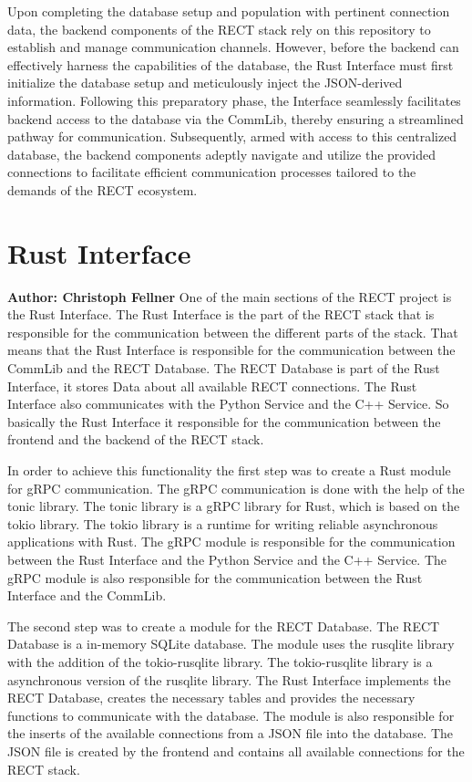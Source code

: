 Upon completing the database setup and population with pertinent connection data, the backend components of the RECT stack rely on this repository to establish and manage 
communication channels. However, before the backend can effectively harness the capabilities of the database, the Rust Interface must first initialize the database setup 
and meticulously inject the JSON-derived information. Following this preparatory phase, the Interface seamlessly facilitates backend access to the database via the CommLib,
thereby ensuring a streamlined pathway for communication. Subsequently, armed with access to this centralized database, the backend components adeptly navigate and utilize
the provided connections to facilitate efficient communication processes tailored to the demands of the RECT ecosystem.

\section{Rust Interface}
\textbf{Author: Christoph Fellner}
One of the main sections of the RECT project is the Rust Interface. The Rust Interface is the part of the RECT stack that is responsible for the communication between 
the different parts of the stack. That means that the Rust Interface is responsible for the communication between the CommLib and the RECT Database. The RECT Database is 
part of the Rust Interface, it stores Data about all available RECT connections. The Rust Interface also communicates with the Python Service and the C++ Service. So 
basically the Rust Interface it responsible for the communication between the frontend and the backend of the RECT stack.\newline

In order to achieve this functionality the first step was to create a Rust module for gRPC communication. The gRPC communication is done with the help of the tonic library.
The tonic library is a gRPC library for Rust, which is based on the tokio library. The tokio library is a runtime for writing reliable asynchronous applications with Rust.
The gRPC module is responsible for the communication between the Rust Interface and the Python Service and the C++ Service. The gRPC module is also responsible for the 
communication between the Rust Interface and the CommLib.\newline 

The second step was to create a module for the RECT Database. The RECT Database is a in-memory SQLite database. The module uses the rusqlite library with the addition of
the tokio-rusqlite library. The tokio-rusqlite library is a asynchronous version of the rusqlite library. The Rust Interface implements the RECT Database, creates the 
necessary tables and provides the necessary functions to communicate with the database. The module is also responsible for the inserts of the available connections from a
JSON file into the database. The JSON file is created by the frontend and contains all available connections for the RECT stack.\newline

